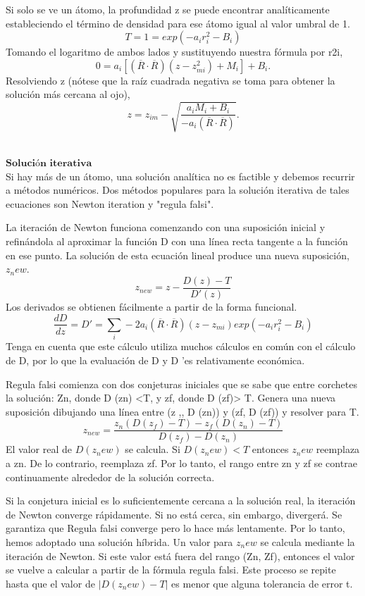 Si solo se ve un átomo, la profundidad z se puede encontrar analíticamente estableciendo el término de densidad para ese átomo igual al valor umbral de 1.
\[
	T = 1 = exp ( -a_i r^{2}_{i} - B_i)
\]
Tomando el logaritmo de ambos lados y sustituyendo nuestra fórmula por r2i,
\[
	0 = a_i [(\overline{R} \cdot \overline{R})(z-z^{2}_{mi}) + M_i] + B_i.
\]
Resolviendo z (nótese que la raíz cuadrada negativa se toma para obtener la solución más cercana al ojo),
\[
	z = z_{im} - \sqrt{\frac{a_i M_i + B_i}{-a_i (\overline{R} \cdot \overline{R})}}.
\]

${ }$\\
$\textbf{Solución iterativa}$
${ }$\\

Si hay más de un átomo, una solución analítica no es factible y debemos recurrir a métodos numéricos. Dos métodos populares para la solución iterativa de tales ecuaciones son Newton iteration y "regula falsi".

La iteración de Newton funciona comenzando con una suposición inicial y refinándola al aproximar la función D con una línea recta tangente a la función en ese punto. La solución de esta ecuación lineal produce una nueva suposición, $z_new$.
\[
	z_{new} = z - \frac{D(z) - T}{D'(z)}
\]
Los derivados se obtienen fácilmente a partir de la forma funcional.
\[
	\frac{dD}{dz} = D' = \sum_{i} -2 a_i (\overline{R} \cdot \overline{R}) (z - z_{mi}) exp(-a_i r^{2}_{i} - B_i)
\]
Tenga en cuenta que este cálculo utiliza muchos cálculos en común con el cálculo de D, por lo que la evaluación de D y D 'es relativamente económica.

Regula falsi comienza con dos conjeturas iniciales que se sabe que entre corchetes la solución: Zn, donde D (zn) <T, y zf, donde D (zf)> T. Genera una nueva suposición dibujando una línea entre (z ,, D (zn)) y (zf, D (zf)) y resolver para T.
\[
	z_{new} = \frac{z_n (D(z_f) - T) - z_f ( D(z_n) - T)}{D(z_f) - D(z_n)}
\]
El valor real de $D (z_new)$ se calcula. Si $D (z_new) <T$ entonces $z_new$ reemplaza a zn. De lo contrario, reemplaza zf. Por lo tanto, el rango entre zn y zf se contrae continuamente alrededor de la solución correcta.

Si la conjetura inicial es lo suficientemente cercana a la solución real, la iteración de Newton converge rápidamente. Si no está cerca, sin embargo, divergerá. Se garantiza que Regula falsi converge pero lo hace más lentamente. Por lo tanto, hemos adoptado una solución híbrida. Un valor para $z_new$ se calcula mediante la iteración de Newton. Si este valor está fuera del rango (Zn, Zf), entonces el valor se vuelve a calcular a partir de la fórmula regula falsi. Este proceso se repite hasta que el valor de $| D (z_new) - T |$ es menor que alguna tolerancia de error t.

